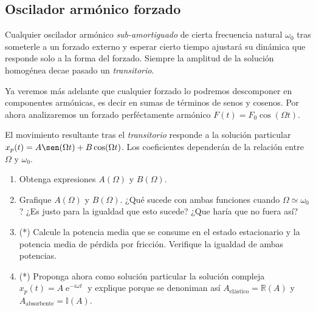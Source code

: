 \subsection*{Oscilador armónico forzado}
\item Cualquier oscilador armónico \emph{sub-amortiguado} de cierta frecuencia natural \(\omega_0\) tras someterle a un forzado externo y esperar cierto tiempo ajustará su dinámica que responde solo a la forma del forzado.
Siempre la amplitud de la solución homogénea decae pasado un \emph{transitorio}. 

Ya veremos más adelante que cualquier forzado lo podremos descomponer en componentes armónicas, es decir en sumas de términos de senos y cosenos.
Por ahora analizaremos un forzado perféctamente armónico \(F(t) = F_0 \cos(\Omega t)\).

El movimiento resultante tras el \emph{transitorio} responde a la solución particular $x_p(t) = A \sen(\Omega t) + B \cos(\Omega t)$.
Los coeficientes dependerán de la relación entre \(\Omega\) y \(\omega_0\).

\begin{enumerate}
	\item Obtenga expresiones $A(\Omega)$ y $B(\Omega)$.
	\item Grafique $A(\Omega)$ y $B(\Omega)$. ¿Qué sucede con ambas funciones cuando \(\Omega \simeq \omega_0\)? ¿Es justo para la igualdad que esto sucede? ¿Que haría que no fuera así? 
	\item (*) Calcule la potencia media que se consume en el estado estacionario y la potencia media de pérdida por fricción.
	Verifique la igualdad de ambas potencias.
	\item (*) Proponga ahora como solución particular la solución compleja \(x_p(t) = A \operatorname{e}^{-i \omega t}\) y explique porque se denoniman así \(A_\text{elástico} = \mathbb{R} (A)\) y \(A_\text{absorbente} = \mathbb{I} (A)\).
\end{enumerate}



